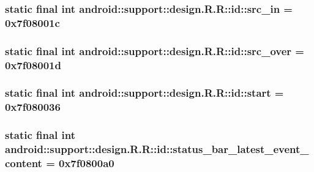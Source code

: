 \hypertarget{classandroid_1_1support_1_1design_1_1_r_1_1id_bb18c46df9e1717510799814fbe09e87}{
\subsubsection[{src\_\-in}]{\setlength{\rightskip}{0pt plus 5cm}static final int android::support::design.R.R::id::src\_\-in = 0x7f08001c}}
\label{classandroid_1_1support_1_1design_1_1_r_1_1id_bb18c46df9e1717510799814fbe09e87}


\hypertarget{classandroid_1_1support_1_1design_1_1_r_1_1id_e4b5c31260a7beaeaa166aab3347602f}{
\subsubsection[{src\_\-over}]{\setlength{\rightskip}{0pt plus 5cm}static final int android::support::design.R.R::id::src\_\-over = 0x7f08001d}}
\label{classandroid_1_1support_1_1design_1_1_r_1_1id_e4b5c31260a7beaeaa166aab3347602f}


\hypertarget{classandroid_1_1support_1_1design_1_1_r_1_1id_e57a81dcf9f42274ff60b0129792ba06}{
\subsubsection[{start}]{\setlength{\rightskip}{0pt plus 5cm}static final int android::support::design.R.R::id::start = 0x7f080036}}
\label{classandroid_1_1support_1_1design_1_1_r_1_1id_e57a81dcf9f42274ff60b0129792ba06}


\hypertarget{classandroid_1_1support_1_1design_1_1_r_1_1id_ada03f9a85e2e22b0e8c86c2ab7a6d02}{
\subsubsection[{status\_\-bar\_\-latest\_\-event\_\-content}]{\setlength{\rightskip}{0pt plus 5cm}static final int android::support::design.R.R::id::status\_\-bar\_\-latest\_\-event\_\-content = 0x7f0800a0}}
\label{classandroid_1_1support_1_1design_1_1_r_1_1id_ada03f9a85e2e22b0e8c86c2ab7a6d02}


